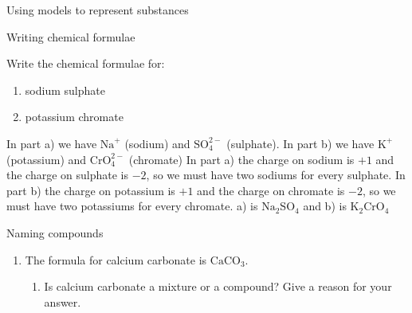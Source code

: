 \begin{activity}{Using models to represent substances}
    \noindent
  \par
            \label{m38708*eip-530}\vspace{.5cm} 
      \noindent
      \begin{wex}{Writing chemical formulae}
{\label{m38708*eip-196}
  \label{m38708*eip-535}Write the chemical formulae for: 
\label{m38708*id87432}\begin{enumerate}[noitemsep, label=\textbf{\alph*}. ] 
\item sodium sulphate
\item potassium chromate
\end{enumerate}
  \par 
\vspace{5pt}}
{
\label{m38708*id874452}
{
In part a) we have ${\mathrm{Na}}^{+}$ (sodium) and $\mathrm{SO}_{4}^{2-}$ (sulphate). In part b) we have ${\mathrm{K}}^{+}$ (potassium) and $\mathrm{CrO}_{4}^{2-}$ (chromate)}
{ In part a) the charge on sodium is $+1$ and the charge on sulphate is $-2$, so we must have two sodiums for every sulphate. In part b) the charge on potassium is $+1$ and the charge on chromate is $-2$, so we must have two potassiums for every chromate.}
{ a) is ${\mathrm{Na}}_{2}{\mathrm{SO}}_{4}$ and b) is ${\mathrm{K}}_{2}{\mathrm{CrO}}_{4}$}}
    \end{wex}
  \label{m38708*secfhsst!!!underscore!!!id255}
            \begin{exercise}{Naming compounds}
{            \nopagebreak
      \label{m38708*id65118}\begin{enumerate}[noitemsep, label=\textbf{\arabic*}. ] 
            \label{m38708*uid47}\item The formula for calcium carbonate is $\mathrm{CaCO}{}_{3}$.
\label{m38708*id65148}\begin{enumerate}[noitemsep, label=\textbf{\alph*}. ] 
            \label{m38708*uid48}\item Is calcium carbonate a mixture or a compound? Give a reason for your answer.

\end{enumerate}
\end{enumerate}}
\end{exercise}
\end{activity}
